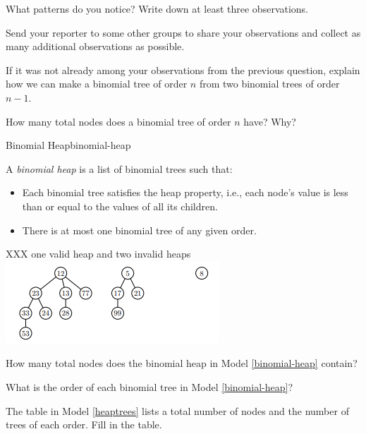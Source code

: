 \documentclass{tufte-handout}
\begin{document}
\begin{questions}
\item What patterns do you notice?  Write down at least three
  observations.

\item Send your reporter to some other groups to share your
  observations and collect as many additional observations as possible.

\item If it was not already among your observations from the previous
  question, explain how we can make a binomial tree of order $n$ from
  two binomial trees of order $n - 1$. \label{binomial-merge}

\item How many total nodes does a binomial tree of order $n$ have?
  Why?

\begin{model*}{Binomial Heap}{binomial-heap}
  \begin{defn}
    A \emph{binomial heap} is a list of binomial trees such that:
    \begin{itemize}
    \item Each binomial tree satisfies the heap property, i.e., each node's value is less than or equal to the values of all its children.
    \item There is at most one binomial tree of any given order.
    \end{itemize}
  \end{defn}
  XXX one valid heap and two invalid heaps
  \includegraphics[]{binomial_heap.PNG}
  \label{binomial-heap}
\end{model*}

\item How many total nodes does the binomial heap in Model \ref{binomial-heap} contain?

\item What is the order of each binomial tree in Model \ref{binomial-heap}?

\item The table in Model \ref{heaptrees} lists a total number of nodes and the number of trees of each order. Fill in the table.


\end{questions}
\end{document}
